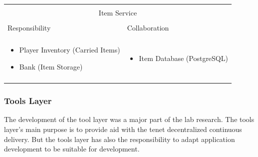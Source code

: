 \vspace{0.5cm} \noindent 
\begin{tabular}{|l|l|}
    \cline{1-2}
    \multicolumn{2}{|c|}{} \\[-0.3cm]
    \multicolumn{2}{|c|}{Item Service} \\ 
    \multicolumn{2}{|c|}{} \\[-0.3cm]
    \cline{1-2}
    Responsibility & Collaboration \\
    \cline{1-2}
    & \\[-0.2cm]
    \begin{minipage}{0.47\textwidth}
        \begin{itemize}
          \item Player Inventory (Carried Items)
          \item Bank (Item Storage)
        \end{itemize} 
    \end{minipage}
	&
    \begin{minipage}{0.47\textwidth}
        \begin{itemize}
          \item Item Database (PostgreSQL)
        \end{itemize} 
    \end{minipage}
	\\ & \\
    \hline
\end{tabular}

\subsubsection{Tools Layer}

The development of the tool layer was a major part of the lab research. The
tools layer's main purpose is to provide aid with the tenet decentralized
continuous delivery. But the tools layer has also the responsibility to adapt
\ms{} application development to be suitable for \og{} development.\\

